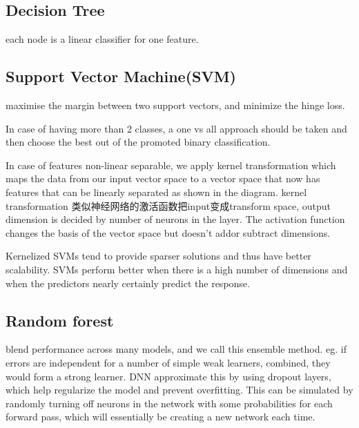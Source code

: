\subsection{Decision Tree}
each node is  a linear classifier for one feature.

\subsection{Support Vector Machine(SVM)} 
maximise the margin between two support vectors, and minimize the hinge loss.
 
 In case of having more than 2 classes, a one vs all approach should be taken and then choose the best out of the promoted binary classification.
 
 In case of features non-linear separable, we apply kernel transformation which maps the data from our input vector space to a vector space that now has features that can be linearly separated as shown in the diagram. 
 kernel transformation 类似神经网络的激活函数把input变成transform space, output dimension is decided by number of neurons in the layer. The activation function changes the basis of the vector space but doesn't addor subtract dimensions.  
 
 Kernelized SVMs tend to provide sparser solutions and thus have better scalability. 
 SVMs perform better when there is a high number of dimensions and when the predictors nearly certainly predict the response.
 
 \subsection{Random forest}
 	blend performance across many models, and we call this ensemble method.
 	eg. if errors are independent for a number of simple weak learners, combined, they would form a strong learner.
 	DNN approximate this by using dropout layers, which help regularize the model and prevent overfitting. This can be simulated by randomly turning off neurons in the network with some probabilities for each forward pass, which will essentially be creating a new network each time.
 
